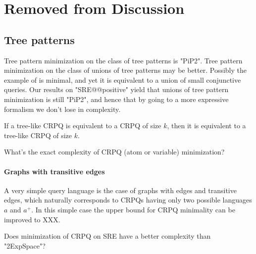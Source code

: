 


\section{Removed from Discussion}
\subsection{Tree patterns} Tree pattern minimization on the class of tree patterns is "PiP2". Tree pattern minimization on the class of unions of tree patterns may be better. Possibly the example of \cite[Fig.~9]{CzerwinskiMartensNiewerthParys2018Minimization} is minimal, and yet it is equivalent to a union of small conjunctive queries.
Our results on "SRE@@positive" yield that unions of tree pattern minimization is still "PiP2", and hence that by going to a more expressive formalism we don't lose in complexity.

\begin{conjecture}
If a tree-like CRPQ is equivalent to a CRPQ of size $k$, then it is equivalent to a tree-like CRPQ of size $k$.
\end{conjecture}



\begin{openproblem}
    What's the exact complexity of CRPQ (atom or variable) minimization?
\end{openproblem}

\paragraph{Graphs with transitive edges} A very simple query language is the case of graphs with edges and transitive edges, which naturally corresponds to CRPQs having only two possible languages $a$ and $a^+$. In this simple case the upper bound for CRPQ minimality can be improved to XXX.

\begin{openproblem}
    Does minimization of CRPQ on SRE have a better complexity than "2ExpSpace"?
\end{openproblem}